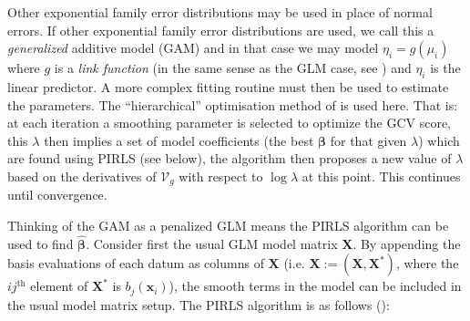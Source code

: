 Other exponential family error distributions may be used in place of normal errors. If other exponential family error distributions are used, we call this a \textit{generalized} additive model (GAM)  and in that case we may model $\eta_i=g(\mu_i)$ where $g$ is a \textit{link function} (in the same sense as the GLM case, see \cite[p. 8]{GEEbook}) and $\eta_i$ is the linear predictor. A more complex fitting routine must then be used to estimate the parameters. The ``hierarchical'' optimisation method of  is used here. That is: at each iteration a smoothing parameter is selected to optimize the GCV score, this $\lambda$ then implies a set of model coefficients (the best $\bm{\beta}$ for that given $\lambda$) which are found using PIRLS (see below), the algorithm then proposes a new value of $\lambda$ based on the derivatives of $\mathcal{V}_g$ with respect to $\log \lambda$ at this point. This continues until convergence.

Thinking of the GAM as a penalized GLM means the PIRLS algorithm can be used to find $\bm{\hat{\beta}}$. Consider first the usual GLM model matrix $\mathbf{X}$. By appending the basis evaluations of each datum as columns of $\mathbf{X}$ (i.e. $\mathbf{X}:=\left ( \mathbf{X},\mathbf{X}^* \right )$, where the $ij^\text{th}$ element of $\mathbf{X}^*$ is  $b_j(\mathbf{x}_i)$), the smooth terms in the model can be included in the usual model matrix setup. The PIRLS algorithm is as follows (\cite[p. 138]{simonbook}):

